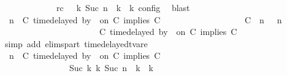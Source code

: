 \begin{isabellebody}
\ \ \ \ \ \ \ \ \ \ \ \ \ rc{\isacharcolon}{\isacartoucheopen}{\isasymrho}\ {\isasymin}\ {\isasymlbrakk}\ {\isasymGamma}\isactrlsub k{\isacharcomma}\ Suc\ n\ {\isasymturnstile}\ {\isasymPsi}\isactrlsub k\ {\isasymtriangleright}\ {\isasymPhi}\isactrlsub k\ {\isasymrbrakk}\isactrlsub c\isactrlsub o\isactrlsub n\isactrlsub f\isactrlsub i\isactrlsub g{\isacartoucheclose}\ \isamarkupfalse%
\ blast\isanewline
\ \ \ \ \ \ \ \ \isamarkupfalse%
\ {\isacartoucheopen}{\isacharparenleft}{\isasymGamma}{\isacharcomma}\ n\ {\isasymturnstile}\ {\isacharparenleft}{\isacharparenleft}C\ time{\isacharminus}delayed{\isasymbowtie}\ by\ {\isasymdelta}{\isasymtau}\ on\ C\ implies\ C\ {\isacharhash}\ {\isasymPsi}{\isacharparenright}\ {\isasymtriangleright}\ {\isasymPhi}{\isacharparenright}\isanewline
\ \ \ \ \ \ \ \ \ \ \ \ \ \ {\isasymhookrightarrow}\ {\isacharparenleft}{\isacharparenleft}{\isacharparenleft}C\ {\isasymnot}{\isasymUp}\ n{\isacharparenright}\ {\isacharhash}\ {\isasymGamma}{\isacharparenright}{\isacharcomma}\ n\isanewline
\ \ \ \ \ \ \ \ \ \ \ \ \ \ \ \ \ \ \ \ {\isasymturnstile}\ {\isasymPsi}\ {\isasymtriangleright}\ {\isacharparenleft}{\isacharparenleft}C\ time{\isacharminus}delayed{\isasymbowtie}\ by\ {\isasymdelta}{\isasymtau}\ on\ C\ implies\ C\ {\isacharhash}\ {\isasymPhi}{\isacharparenright}{\isacharparenright}{\isacartoucheclose}\isanewline
\ \ \ \ \ \ \ \ \ \ \isamarkupfalse%
\ {\isacharparenleft}simp\ add{\isacharcolon}\ elims{\isacharunderscore}part\ timedelayed{\isacharunderscore}tvar{\isacharunderscore}e{}{\isacharparenright}\isanewline
\ \ \ \ \ \ \ \ \isamarkupfalse%
\ {\isacartoucheopen}{\isacharparenleft}{\isasymGamma}{\isacharcomma}\ n\ {\isasymturnstile}\ {\isacharparenleft}{\isacharparenleft}C\ time{\isacharminus}delayed{\isasymbowtie}\ by\ {\isasymdelta}{\isasymtau}\ on\ C\ implies\ C\ {\isacharhash}\ {\isasymPsi}{\isacharparenright}\ {\isasymtriangleright}\ {\isasymPhi}{\isacharparenright}\isanewline
\ \ \ \ \ \ \ \ \ \ \ \ \ \ \ \ {\isasymhookrightarrow}\isactrlbsup Suc\ k\isactrlesup \ {\isacharparenleft}{\isasymGamma}\isactrlsub k{\isacharcomma}\ Suc\ n\ {\isasymturnstile}\ {\isasymPsi}\isactrlsub k\ {\isasymtriangleright}\ {\isasymPhi}\isactrlsub k{\isacharparenright}{\isacartoucheclose}\isanewline

\end{isabellebody}
